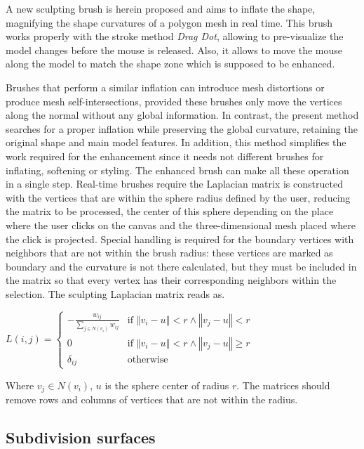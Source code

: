 \documentclass[10pt, conference]{IEEEtran}
\begin{document}
A new sculpting brush is herein proposed and aims to inflate the shape,
magnifying the shape curvatures of a polygon mesh in real time. This
brush works properly with the stroke method \textsl{Drag Dot}, allowing
to pre-visualize the model changes before the mouse is released. Also,
it allows to move the mouse along the model to match the shape zone
which is supposed to be enhanced.

Brushes that perform a similar inflation can introduce mesh distortions
or produce mesh self-intersections, provided these brushes only move
the vertices along the normal without any global information. In contrast,
the present method searches for a proper inflation while preserving
the global curvature, retaining the original shape and main model
features. In addition, this method simplifies the work required for
the enhancement since it needs not different brushes for inflating,
softening or styling. The enhanced brush can make all these operation
in a single step. Real-time brushes require the Laplacian matrix is
constructed with the vertices that are within the sphere radius defined
by the user, reducing the matrix to be processed, the center of this
sphere depending on the place where the user clicks on the canvas
and the three-dimensional mesh placed where the click is projected.
Special handling is required for the boundary vertices with neighbors
that are not within the brush radius: these vertices are marked as
boundary and the curvature is not there calculated, but they must
be included in the matrix so that every vertex has their corresponding
neighbors within the selection. The sculpting Laplacian matrix reads
as.

\begin{center}
$L\left(i,j\right)=\begin{cases}
-\frac{w_{ij}}{\underset{j\in N\left(v_{i}\right)}{\sum}w_{ij}} & \mbox{if }\left\Vert v_{i}-u\right\Vert <r\wedge\left\Vert v_{j}-u\right\Vert <r\\
0 & \mbox{if }\left\Vert v_{i}-u\right\Vert <r\wedge\left\Vert v_{j}-u\right\Vert \geq r\\
\delta_{ij} & \mbox{otherwise}
\end{cases}$
\par\end{center}

Where $v_{j}\in N\left(v_{i}\right)$, $u$ is the sphere center of
radius $r$. The matrices should remove rows and columns of vertices
that are not within the radius.


\subsection{Subdivision surfaces\label{sub:Subdivision-surfaces}}
\end{document}
